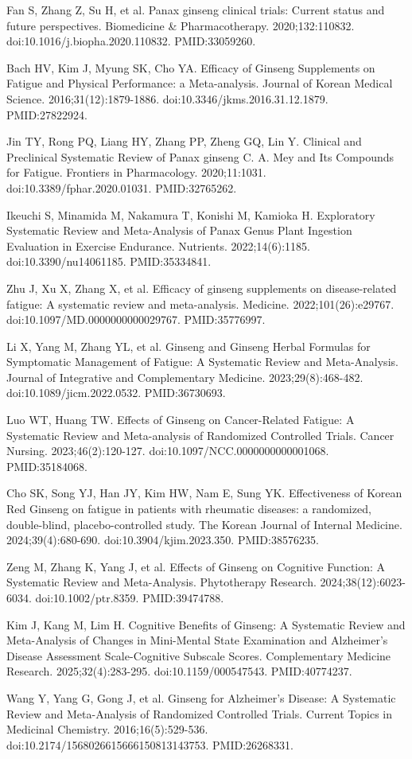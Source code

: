 \documentclass[11pt,oneside]{book}
\newcommand{\reff}[2]{\par\hangindent=7mm\hangafter=1\noindent[#1]\hspace{2mm}#2\par}
\begin{document}
\reff{35}{Fan S, Zhang Z, Su H, et al. Panax ginseng clinical trials: Current status and future perspectives. Biomedicine \& Pharmacotherapy. 2020;132:110832. doi:10.1016/j.biopha.2020.110832. PMID:33059260.}
\reff{36}{Bach HV, Kim J, Myung SK, Cho YA. Efficacy of Ginseng Supplements on Fatigue and Physical Performance: a Meta-analysis. Journal of Korean Medical Science. 2016;31(12):1879-1886. doi:10.3346/jkms.2016.31.12.1879. PMID:27822924.}
\reff{37}{Jin TY, Rong PQ, Liang HY, Zhang PP, Zheng GQ, Lin Y. Clinical and Preclinical Systematic Review of Panax ginseng C. A. Mey and Its Compounds for Fatigue. Frontiers in Pharmacology. 2020;11:1031. doi:10.3389/fphar.2020.01031. PMID:32765262.}
\reff{38}{Ikeuchi S, Minamida M, Nakamura T, Konishi M, Kamioka H. Exploratory Systematic Review and Meta-Analysis of Panax Genus Plant Ingestion Evaluation in Exercise Endurance. Nutrients. 2022;14(6):1185. doi:10.3390/nu14061185. PMID:35334841.}
\reff{39}{Zhu J, Xu X, Zhang X, et al. Efficacy of ginseng supplements on disease-related fatigue: A systematic review and meta-analysis. Medicine. 2022;101(26):e29767. doi:10.1097/MD.0000000000029767. PMID:35776997.}
\reff{40}{Li X, Yang M, Zhang YL, et al. Ginseng and Ginseng Herbal Formulas for Symptomatic Management of Fatigue: A Systematic Review and Meta-Analysis. Journal of Integrative and Complementary Medicine. 2023;29(8):468-482. doi:10.1089/jicm.2022.0532. PMID:36730693.}
\reff{41}{Luo WT, Huang TW. Effects of Ginseng on Cancer-Related Fatigue: A Systematic Review and Meta-analysis of Randomized Controlled Trials. Cancer Nursing. 2023;46(2):120-127. doi:10.1097/NCC.0000000000001068. PMID:35184068.}
\reff{42}{Cho SK, Song YJ, Han JY, Kim HW, Nam E, Sung YK. Effectiveness of Korean Red Ginseng on fatigue in patients with rheumatic diseases: a randomized, double-blind, placebo-controlled study. The Korean Journal of Internal Medicine. 2024;39(4):680-690. doi:10.3904/kjim.2023.350. PMID:38576235.}
\reff{43}{Zeng M, Zhang K, Yang J, et al. Effects of Ginseng on Cognitive Function: A Systematic Review and Meta-Analysis. Phytotherapy Research. 2024;38(12):6023-6034. doi:10.1002/ptr.8359. PMID:39474788.}
\reff{44}{Kim J, Kang M, Lim H. Cognitive Benefits of Ginseng: A Systematic Review and Meta-Analysis of Changes in Mini-Mental State Examination and Alzheimer's Disease Assessment Scale-Cognitive Subscale Scores. Complementary Medicine Research. 2025;32(4):283-295. doi:10.1159/000547543. PMID:40774237.}
\reff{45}{Wang Y, Yang G, Gong J, et al. Ginseng for Alzheimer's Disease: A Systematic Review and Meta-Analysis of Randomized Controlled Trials. Current Topics in Medicinal Chemistry. 2016;16(5):529-536. doi:10.2174/1568026615666150813143753. PMID:26268331.}
\end{document}
